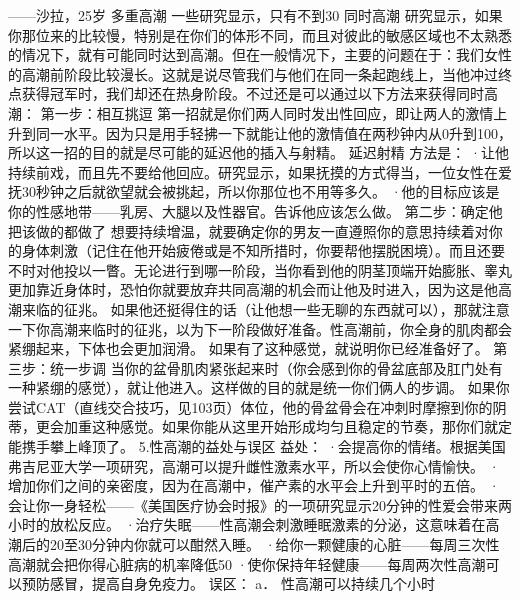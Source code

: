 \documentclass[12pt,UTF8]{ctexbook}
\begin{document}
——沙拉，25岁
多重高潮
一些研究显示，只有不到30%
同时高潮
研究显示，如果你那位来的比较慢，特别是在你们的体形不同，而且对彼此的敏感区域也不太熟悉的情况下，就有可能同时达到高潮。但在一般情况下，主要的问题在于：我们女性的高潮前阶段比较漫长。这就是说尽管我们与他们在同一条起跑线上，当他冲过终点获得冠军时，我们却还在热身阶段。不过还是可以通过以下方法来获得同时高潮：
第一步：相互挑逗
第一招就是你们两人同时发出性回应，即让两人的激情上升到同一水平。因为只是用手轻拂一下就能让他的激情值在两秒钟内从0升到100，所以这一招的目的就是尽可能的延迟他的插入与射精。
延迟射精
方法是：
·让他持续前戏，而且先不要给他回应。研究显示，如果抚摸的方式得当，一位女性在爱抚30秒钟之后就欲望就会被挑起，所以你那位也不用等多久。
·他的目标应该是你的性感地带——乳房、大腿以及性器官。告诉他应该怎么做。
第二步：确定他把该做的都做了
想要持续增温，就要确定你的男友一直遵照你的意思持续着对你的身体刺激（记住在他开始疲倦或是不知所措时，你要帮他摆脱困境）。而且还要不时对他投以一瞥。无论进行到哪一阶段，当你看到他的阴茎顶端开始膨胀、睾丸更加靠近身体时，恐怕你就要放弃共同高潮的机会而让他及时进入，因为这是他高潮来临的征兆。
如果他还挺得住的话（让他想一些无聊的东西就可以），那就注意一下你高潮来临时的征兆，以为下一阶段做好准备。性高潮前，你全身的肌肉都会紧绷起来，下体也会更加润滑。
如果有了这种感觉，就说明你已经准备好了。
第三步：统一步调
当你的盆骨肌肉紧张起来时（你会感到你的骨盆底部及肛门处有一种紧绷的感觉），就让他进入。这样做的目的就是统一你们俩人的步调。
如果你尝试CAT（直线交合技巧，见103页）体位，他的骨盆骨会在冲刺时摩擦到你的阴蒂，更会加重这种感觉。如果你能从这里开始形成均匀且稳定的节奏，那你们就定能携手攀上峰顶了。
5.性高潮的益处与误区
益处：
·会提高你的情绪。根据美国弗吉尼亚大学一项研究，高潮可以提升雌性激素水平，所以会使你心情愉快。
·增加你们之间的亲密度，因为在高潮中，催产素的水平会上升到平时的五倍。
·会让你一身轻松——《美国医疗协会时报》的一项研究显示20分钟的性爱会带来两小时的放松反应。
·治疗失眠——性高潮会刺激睡眠激素的分泌，这意味着在高潮后的20至30分钟内你就可以酣然入睡。
·给你一颗健康的心脏——每周三次性高潮就会把你得心脏病的机率降低50%
·使你保持年轻健康——每周两次性高潮可以预防感冒，提高自身免疫力。
误区：
a． 性高潮可以持续几个小时
\end{document}
